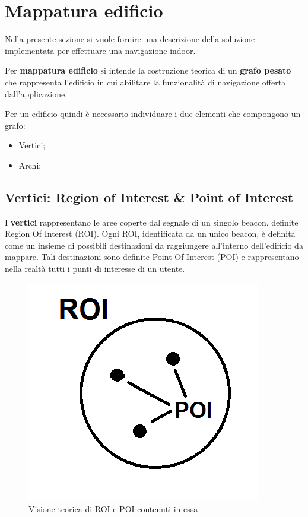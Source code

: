 \documentclass[../ManualeSviluppatore.tex]{subfiles}
\begin{document}
\section{Mappatura edificio}
	Nella presente sezione si vuole fornire una descrizione della soluzione implementata per effettuare una \gls{navigazione indoor}.
	
	Per \textbf{mappatura edificio} si intende la costruzione teorica di un \textbf{grafo pesato} che rappresenta l'edificio in cui abilitare la funzionalità di navigazione offerta dall'applicazione.
	
	Per un edificio quindi è necessario individuare i due elementi che compongono un grafo:
	\begin{itemize}
		\item Vertici;
		\item Archi;
	\end{itemize}
	
	\subsection{Vertici: Region of Interest \& Point of Interest}
	
	I \textbf{vertici} rappresentano le aree coperte dal segnale di un singolo \gls{beacon}, definite Region Of Interest (\gls{ROI}).
	Ogni ROI, identificata da un unico \gls{beacon}, è definita come un insieme di possibili destinazioni da raggiungere all'interno dell'edificio da mappare. Tali destinazioni sono definite Point Of Interest (\gls{POI}) e rappresentano nella realtà tutti i punti di interesse di un utente.
	
	\begin{figure} [h]
		\centering
		\includegraphics[scale=0.4]{img/ROIePOI}
		\caption{Visione teorica di ROI e POI contenuti in essa}
		\label{fig:ROIePOI}
	\end{figure}
	
\end{document}
